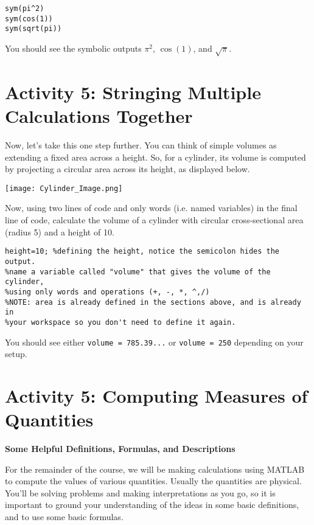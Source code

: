 \documentclass{ximera}
\begin{document}
\begin{verbatim}
sym(pi^2)
sym(cos(1))
sym(sqrt(pi))
\end{verbatim}

You should see the symbolic outputs \(\pi^2\), \(\cos(1)\), and \(\sqrt{\pi}\).

\section*{Activity 5: Stringing Multiple Calculations Together}

Now, let's take this one step further. You can think of simple volumes as extending a fixed area across a height. So, for a cylinder, its volume is computed by projecting a circular area across its height, as displayed below.

\begin{center}
\texttt{[image: Cylinder\_Image.png]}
\end{center}

\begin{example}
Now, using two lines of code and only words (i.e. named variables) in the final line of code, calculate the volume of a cylinder with circular cross-sectional area (radius 5) and a height of 10.

\begin{verbatim}
height=10; %defining the height, notice the semicolon hides the output.
%name a variable called "volume" that gives the volume of the cylinder,
%using only words and operations (+, -, *, ^,/)
%NOTE: area is already defined in the sections above, and is already in
%your workspace so you don't need to define it again.
\end{verbatim}

You should see either \texttt{volume = 785.39...} or \texttt{volume = 250} depending on your setup.
\end{example}

\section*{Activity 5: Computing Measures of Quantities}

\textbf{Some Helpful Definitions, Formulas, and Descriptions}

For the remainder of the course, we will be making calculations using MATLAB to compute the values of various quantities. Usually the quantities are physical. You'll be solving problems and making interpretations as you go, so it is important to ground your understanding of the ideas in some basic definitions, and to use some basic formulas.
\end{document}
